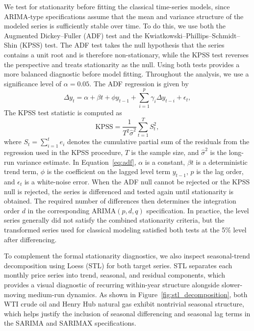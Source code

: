 \documentclass[pdflatex,sn-mathphys-num]{sn-jnl}%
\theoremstyle{thmstyleone}%
\theoremstyle{thmstyletwo}%
\theoremstyle{thmstylethree}%
\begin{document}
We test for stationarity before fitting the classical time-series models, since ARIMA-type specifications assume that the mean and variance structure of the modeled series is sufficiently stable over time. To do this, we use both the Augmented Dickey--Fuller (ADF) test and the Kwiatkowski--Phillips--Schmidt--Shin (KPSS) test. The ADF test takes the null hypothesis that the series contains a unit root and is therefore non-stationary, while the KPSS test reverses the perspective and treats stationarity as the null. Using both tests provides a more balanced diagnostic before model fitting. Throughout the analysis, we use a significance level of $\alpha = 0.05$. The ADF regression is given by
\begin{equation}
 \Delta y_t = \alpha + \beta t + \phi y_{t-1} + \sum_{i=1}^{p} \gamma_i \Delta y_{t-i} + \epsilon_t,
\label{eq:adf}
\end{equation}
The KPSS test statistic is computed as
\begin{equation}
 \mathrm{KPSS} = \frac{1}{T^2 \hat{\sigma}^2} \sum_{t=1}^{T} S_t^2,
\label{eq:kpss}
\end{equation}
where $S_t = \sum_{i=1}^{t} e_i$ denotes the cumulative partial sum of the residuals from the regression used in the KPSS procedure, $T$ is the sample size, and $\hat{\sigma}^2$ is the long-run variance estimate. In Equation~\ref{eq:adf}, $\alpha$ is a constant, $\beta t$ is a deterministic trend term, $\phi$ is the coefficient on the lagged level term $y_{t-1}$, $p$ is the lag order, and $\epsilon_t$ is a white-noise error. When the ADF null cannot be rejected or the KPSS null is rejected, the series is differenced and tested again until stationarity is obtained. The required number of differences then determines the integration order $d$ in the corresponding ARIMA$(p,d,q)$ specification. In practice, the level series generally did not satisfy the combined stationarity criteria, but the transformed series used for classical modeling satisfied both tests at the 5\% level after differencing.

To complement the formal stationarity diagnostics, we also inspect seasonal-trend decomposition using Loess (STL) for both target series. STL separates each monthly price series into trend, seasonal, and residual components, which provides a visual diagnostic of recurring within-year structure alongside slower-moving medium-run dynamics. As shown in Figure~\ref{fig:stl_decomposition}, both WTI crude oil and Henry Hub natural gas exhibit nontrivial seasonal structure, which helps justify the inclusion of seasonal differencing and seasonal lag terms in the SARIMA and SARIMAX specifications.
\end{document}
